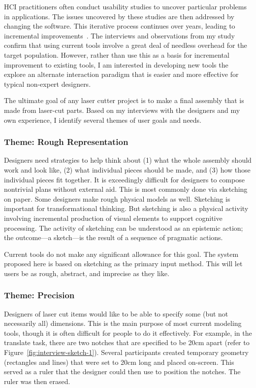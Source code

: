 \documentclass[11pt]{article}
\begin{document}
HCI practitioners often conduct usability studies to uncover
particular problems in applications. The issues uncovered by these
studies are then addressed by changing the software. This iterative
process continues over years, leading to incremental
improvements~\cite{buxton-sketching}. The interviews and observations
from my study confirm that using current tools involve a great deal of
needless overhead for the target population. However, rather than use
this as a basis for incremental improvement to existing tools, I am
interested in developing new tools the explore an alternate
interaction paradigm that is easier and more effective for typical
non-expert designers.

The ultimate goal of any laser cutter project is to make a final
assembly that is made from laser-cut parts. Based on my interviews
with the designers and my own experience, I identify several themes of
user goals and needs.

\subsubsection{Theme: Rough Representation} 

Designers need strategies to help think about (1) what the whole
assembly should work and look like, (2) what individual pieces should
be made, and (3) how those individual pieces fit together. It is
exceedingly difficult for designers to compose nontrivial plans
without external aid. This is most commonly done via sketching on
paper. Some designers make rough physical models as well. Sketching is
important for transformational thinking. But sketching is also a
physical activity involving incremental production of visual elements
to support cognitive processing. The activity of sketching can be
understood as an epistemic action; the outcome---a sketch---is the
result of a sequence of pragmatic actions.

Current tools do not make any significant allowance for this goal. The
system proposed here is based on sketching as the primary input
method. This will let users be as rough, abstract, and imprecise as
they like.

\subsubsection{Theme: Precision}

Designers of laser cut items would like to be able to specify some
(but not necessarily all) dimensions. This is the main purpose of most
current modeling tools, though it is often difficult for people to do
it effectively. For example, in the translate task, there are two
notches that are specified to be 20cm apart (refer to
Figure~\ref{fig:interview-sketch-1}). Several participants created
temporary geometry (rectangles and lines) that were set to 20cm long
and placed on-screen. This served as a ruler that the designer could
then use to position the notches. The ruler was then erased.
\end{document}
